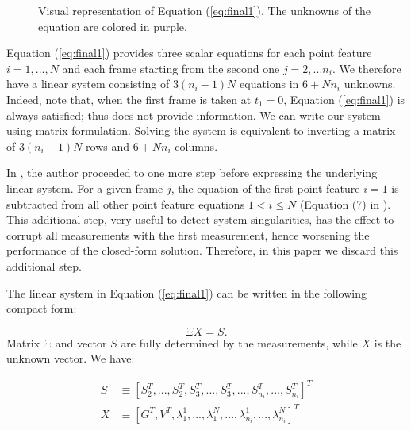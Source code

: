 \documentclass[letterpaper, 10pt, conference, final]{ieeeconf}  %
\begin{document}
\begin{figure}
  \centering
  \def\svgwidth{\columnwidth}
  
  \caption{Visual representation of Equation (\ref{eq:final1}).
  The unknowns of the equation are colored in \textcolor{amethyst}{purple}.}
\end{figure}

Equation (\ref{eq:final1}) provides three scalar equations for each point feature $i=1,...,N$ and each frame starting from the second one $j=2,...n_i$.
We therefore have a linear system consisting of $3(n_i-1)N$ equations in $6 + Nn_i$ unknowns.
Indeed, note that, when the first frame is taken at $t_1 = 0$,
Equation (\ref{eq:final1}) is always satisfied; thus does not provide information.
We can write our system using matrix formulation.
Solving the system is equivalent to inverting a matrix of $3(n_i-1)N$ rows and $6+Nn_i$ columns.

In \cite{Martinelli2014}, the author proceeded to one more step before expressing the underlying linear system.
For a given frame $j$, the equation of the first point feature $i=1$ is subtracted from all other point feature equations $1<i \leq N$ (Equation (7) in \cite{Martinelli2014}).
This additional step, very useful to detect system singularities, has the effect to corrupt all measurements with the first measurement,
hence worsening the performance of the closed-form solution. Therefore,
in this paper we discard this additional step.

The linear system in Equation (\ref{eq:final1}) can be written in the following compact form:

\begin{equation}
\label{eq:mat1}
\Xi X = S.
\end{equation}
\noindent Matrix $\Xi$ and vector $S$ are fully determined by the measurements, while $X$ is the unknown vector.
We have:

\begin{equation*}
  \begin{aligned}
S &\equiv [S_2^T, ...,S_2^T, S_3^T,...,S_3^T,...,S_{n_i}^T,...,S_{n_i}^T]^T \\
X &\equiv [ G^T, V^T, \lambda_1^1, ..., \lambda_1^N, ..., \lambda_{n_i}^1, ..., \lambda_{n_i}^N]^T
  \end{aligned}
\end{equation*}
\vspace{-1cm}
\end{document}
